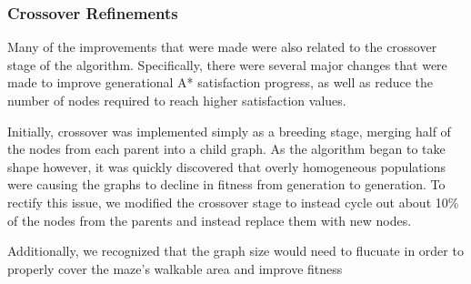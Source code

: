 	\subsubsection{Crossover Refinements}
	Many of the improvements that were made were also related to the crossover stage of the algorithm. Specifically, there were several major changes that were made to improve generational A* satisfaction progress, as well as reduce the number of nodes required to reach higher satisfaction values.
	
	Initially, crossover was implemented simply as a breeding stage, merging half of the nodes from each parent into a child graph. As the algorithm began to take shape however, it was quickly discovered that overly homogeneous populations were causing the graphs to decline in fitness from generation to generation. To rectify this issue, we modified the crossover stage to instead cycle out about 10\% of the nodes from the parents and instead replace them with new nodes.
	
	Additionally, we recognized that the graph size would need to flucuate in order to properly cover the maze's walkable area and improve fitness
	
	
	
	
	
	